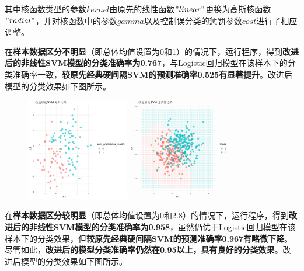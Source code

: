 \documentclass[12pt]{article}  %
\begin{document}
其中核函数类型的参数$kernel$由原先的线性函数$"linear"$更换为高斯核函数$"radial"$，并对核函数中的参数$gamma$以及控制误分类的惩罚参数$cost$进行了相应调整。

在\textbf{样本数据区分不明显}（即总体均值设置为0和1）的情况下，运行程序，得到\textbf{改进后的非线性SVM模型的分类准确率为0.767}，与Logistic回归模型在该样本下的分类准确率一致，\textbf{较原先经典硬间隔SVM的预测准确率0.525有显著提升}。改进后模型的分类效果如下图所示。

\begin{figure}[H]
	\centering
	\includegraphics[width=0.4\textwidth]{14.png}
	\includegraphics[width=0.4\textwidth]{15.png}
\end{figure}

在\textbf{样本数据区分较明显}（即总体均值设置为0和2.8）的情况下，运行程序，得到\textbf{改进后的非线性SVM模型的分类准确率为0.958}，虽然仍优于Logistic回归模型在该样本下的分类效果，但\textbf{较原先经典硬间隔SVM的预测准确率0.967有略微下降}。尽管如此，\textbf{改进后的模型分类准确率仍然在0.95以上，具有良好的分类效果}。改进后模型的分类效果如下图所示。
\end{document}
